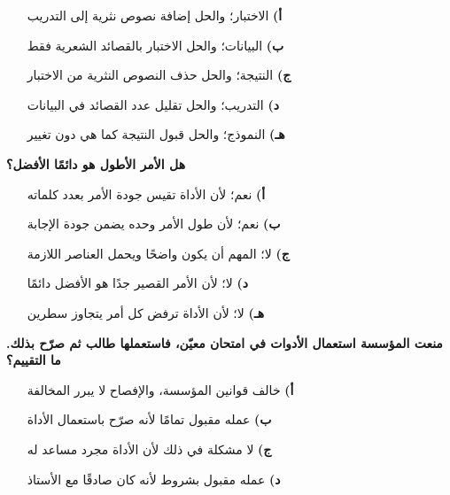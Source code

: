 \documentclass[11pt,a4paper]{article}
\begin{document}
\begin{multicols}{2}
\begin{minipage}{\linewidth}
\begin{itemize}[leftmargin=0.95cm, labelsep=4pt, itemsep=0pt, topsep=2pt, parsep=0pt]
  \item[\textbf{أ)}] الاختبار؛ والحل إضافة نصوص نثرية إلى التدريب
  \item[\textbf{ب)}] البيانات؛ والحل الاختبار بالقصائد الشعرية فقط
  \item[\textbf{ج)}] النتيجة؛ والحل حذف النصوص النثرية من الاختبار
  \item[\textbf{د)}] التدريب؛ والحل تقليل عدد القصائد في البيانات
  \item[\textbf{هـ)}] النموذج؛ والحل قبول النتيجة كما هي دون تغيير
\end{itemize}
\end{minipage}\par\vspace{7pt plus 4pt}
\noindent\begin{minipage}{\linewidth}
\hangindent=0.7cm\textbf{هل الأمر الأطول هو دائمًا الأفضل؟}
\begin{itemize}[leftmargin=0.95cm, labelsep=4pt, itemsep=0pt, topsep=2pt, parsep=0pt]
  \item[\textbf{أ)}] نعم؛ لأن الأداة تقيس جودة الأمر بعدد كلماته
  \item[\textbf{ب)}] نعم؛ لأن طول الأمر وحده يضمن جودة الإجابة
  \item[\textbf{ج)}] لا؛ المهم أن يكون واضحًا ويحمل العناصر اللازمة
  \item[\textbf{د)}] لا؛ لأن الأمر القصير جدًا هو الأفضل دائمًا
  \item[\textbf{هـ)}] لا؛ لأن الأداة ترفض كل أمر يتجاوز سطرين
\end{itemize}
\end{minipage}\par\vspace{7pt plus 4pt}
\noindent\begin{minipage}{\linewidth}
\hangindent=0.7cm\textbf{منعت المؤسسة استعمال الأدوات في امتحان معيّن، فاستعملها طالب ثم صرّح بذلك. ما التقييم؟}
\begin{itemize}[leftmargin=0.95cm, labelsep=4pt, itemsep=0pt, topsep=2pt, parsep=0pt]
  \item[\textbf{أ)}] خالف قوانين المؤسسة، والإفصاح لا يبرر المخالفة
  \item[\textbf{ب)}] عمله مقبول تمامًا لأنه صرّح باستعمال الأداة
  \item[\textbf{ج)}] لا مشكلة في ذلك لأن الأداة مجرد مساعد له
  \item[\textbf{د)}] عمله مقبول بشروط لأنه كان صادقًا مع الأستاذ

\end{itemize}
\end{minipage}
\end{multicols}
\end{document}
